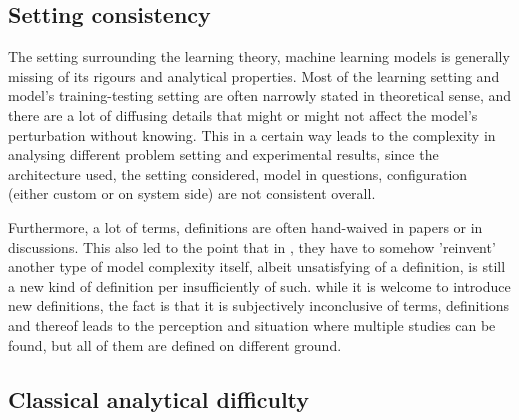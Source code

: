 \documentclass{article}
\begin{document}
\subsection{Setting consistency}

The setting surrounding the learning theory, machine learning models is generally missing of its rigours and analytical properties. Most of the learning setting and model's training-testing setting are often narrowly stated in theoretical sense, and there are a lot of diffusing details that might or might not affect the model's perturbation without knowing. This in a certain way leads to the complexity in analysing different problem setting and experimental results, since the architecture used, the setting considered, model in questions, configuration (either custom or on system side) are not consistent overall. 

Furthermore, a lot of terms, definitions are often hand-waived in papers or in discussions. This also led to the point that in \cite{nakkiran_deep_2019}, they have to somehow 'reinvent' another type of model complexity itself, albeit unsatisfying of a definition, is still a new kind of definition per insufficiently of such. while it is welcome to introduce new definitions, the fact is that it is subjectively inconclusive of terms, definitions and thereof leads to the perception and situation where multiple studies can be found, but all of them are defined on different ground.

\subsection{Classical analytical difficulty}
\end{document}
